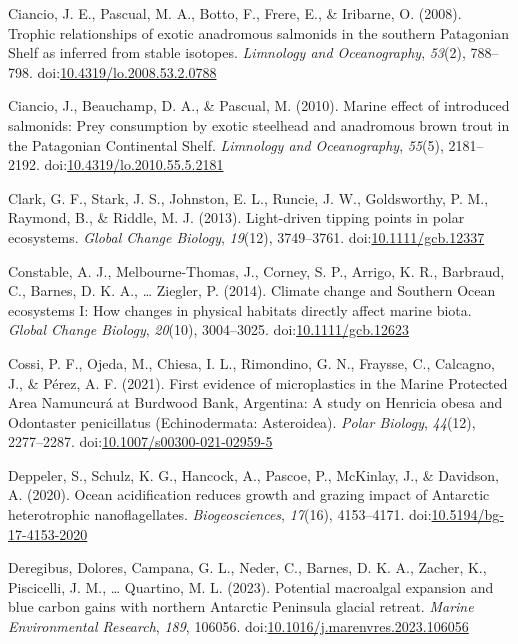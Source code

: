 \documentclass[
]{article}
\newlength{\cslhangindent}
\newenvironment{CSLReferences}[2] %
 {\begin{list}{}{%
  \setlength{\itemindent}{0pt}
  \setlength{\leftmargin}{0pt}
  \setlength{\parsep}{0pt}
  \ifodd #1
   \setlength{\leftmargin}{\cslhangindent}
   \setlength{\itemindent}{-1\cslhangindent}
  \fi
  \setlength{\itemsep}{#2\baselineskip}}}
 {\end{list}}
\begin{document}
\begin{CSLReferences}{1}{0}
Ciancio, J. E., Pascual, M. A., Botto, F., Frere, E., \& Iribarne, O.
(2008). Trophic relationships of exotic anadromous salmonids in the
southern {Patagonian Shelf} as inferred from stable isotopes.
\emph{Limnology and Oceanography}, \emph{53}(2), 788--798.
doi:\href{https://doi.org/10.4319/lo.2008.53.2.0788}{10.4319/lo.2008.53.2.0788}

Ciancio, J., Beauchamp, D. A., \& Pascual, M. (2010). Marine effect of
introduced salmonids: {Prey} consumption by exotic steelhead and
anadromous brown trout in the {Patagonian Continental Shelf}.
\emph{Limnology and Oceanography}, \emph{55}(5), 2181--2192.
doi:\href{https://doi.org/10.4319/lo.2010.55.5.2181}{10.4319/lo.2010.55.5.2181}

Clark, G. F., Stark, J. S., Johnston, E. L., Runcie, J. W., Goldsworthy,
P. M., Raymond, B., \& Riddle, M. J. (2013). Light-driven tipping points
in polar ecosystems. \emph{Global Change Biology}, \emph{19}(12),
3749--3761.
doi:\href{https://doi.org/10.1111/gcb.12337}{10.1111/gcb.12337}

Constable, A. J., Melbourne-Thomas, J., Corney, S. P., Arrigo, K. R.,
Barbraud, C., Barnes, D. K. A., \ldots{} Ziegler, P. (2014). Climate
change and {Southern Ocean} ecosystems {I}: How changes in physical
habitats directly affect marine biota. \emph{Global Change Biology},
\emph{20}(10), 3004--3025.
doi:\href{https://doi.org/10.1111/gcb.12623}{10.1111/gcb.12623}

Cossi, P. F., Ojeda, M., Chiesa, I. L., Rimondino, G. N., Fraysse, C.,
Calcagno, J., \& Pérez, A. F. (2021). First evidence of microplastics in
the {Marine Protected Area Namuncurá} at {Burdwood Bank}, {Argentina}: A
study on {Henricia} obesa and {Odontaster} penicillatus
({Echinodermata}: {Asteroidea}). \emph{Polar Biology}, \emph{44}(12),
2277--2287.
doi:\href{https://doi.org/10.1007/s00300-021-02959-5}{10.1007/s00300-021-02959-5}

Deppeler, S., Schulz, K. G., Hancock, A., Pascoe, P., McKinlay, J., \&
Davidson, A. (2020). Ocean acidification reduces growth and grazing
impact of {Antarctic} heterotrophic nanoflagellates.
\emph{Biogeosciences}, \emph{17}(16), 4153--4171.
doi:\href{https://doi.org/10.5194/bg-17-4153-2020}{10.5194/bg-17-4153-2020}

Deregibus, Dolores, Campana, G. L., Neder, C., Barnes, D. K. A., Zacher,
K., Piscicelli, J. M., \ldots{} Quartino, M. L. (2023). Potential
macroalgal expansion and blue carbon gains with northern {Antarctic
Peninsula} glacial retreat. \emph{Marine Environmental Research},
\emph{189}, 106056.
doi:\href{https://doi.org/10.1016/j.marenvres.2023.106056}{10.1016/j.marenvres.2023.106056}


\end{CSLReferences}
\end{document}
